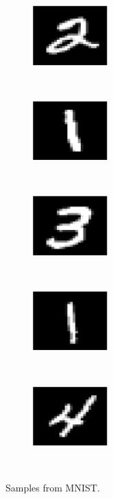 \documentclass[a4paper,11pt]{report}
\begin{document}
\begin{figure}[h]
\begin{subfigure}[t]{0.17\textwidth}
			\end{subfigure}
			\\
			~
			\begin{subfigure}[t]{0.17\textwidth}
				\centering
				\includegraphics[height=0.9in]{mnist_6.eps}
			\end{subfigure}%
			~ 
			\begin{subfigure}[t]{0.17\textwidth}
        \centering
        \includegraphics[height=0.9in]{mnist_7.eps}
			\end{subfigure}
			~ 
			\begin{subfigure}[t]{0.17\textwidth}
        \centering
        \includegraphics[height=0.9in]{mnist_8.eps}
			\end{subfigure}
			~ 
			\begin{subfigure}[t]{0.17\textwidth}
        \centering
        \includegraphics[height=0.9in]{mnist_9.eps}
			\end{subfigure}
			~ 
			\begin{subfigure}[t]{0.17\textwidth}
        \centering
        \includegraphics[height=0.9in]{mnist_10.eps}
			\end{subfigure}
			~
			\caption{Samples from MNIST.}
			\label{fig:Mnist}
		\end{figure}
		
\end{document}
